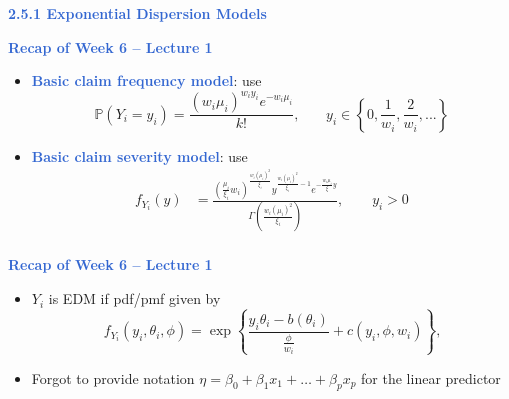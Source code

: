 \documentclass[aspectratio=169,professionalfonts,mathserif,handout]{beamer}
\newcommand{\highlight}[1]{\textcolor{Highlight}{\bf #1}}
\renewcommand{\(}{\left(}
\renewcommand{\)}{\right)}
\renewcommand{\[}{\left[}
\renewcommand{\]}{\right]}
\newcommand{\mytitle}[1]{\vspace*{-1mm}%
  \centerline{\highlight{\Large #1}}\vspace*{3mm}}
\newenvironment{slidebox}{%
  \begin{minipage}[c][7.5cm][t]{14.4cm}\raggedright}{%
  \end{minipage}}
\begin{document}
\begin{frame}\begin{slidebox}
\mytitle{2.5.1 Exponential Dispersion Models}
\end{slidebox}\end{frame}

\begin{frame}\begin{slidebox}
\mytitle{Recap of Week 6 -- Lecture 1}
\begin{itemize}
    \item \highlight{Basic claim frequency model}: use
    $$
\mathbb{P}\left(  Y_{i}=y_{i}\right)  =\frac{\left(  w_{i}\mu_{i}\right)
^{w_{i}y_{i}}e^{-w_{i}\mu_{i}}}{k!}\text{,} \qquad y_{i}\in\left\{  0,\frac{1}{w_{i}},\frac{2}{w_{i}},...\right\}  
$$
\pause
\item \highlight{Basic claim severity model}: use
\begin{align*}
f_{Y_{i}}\left(  y\right)   &  =\frac{\left(  \frac{\mu_{i}}{\xi_{i}}%
w_{i}\right)  ^{\frac{w_{i}\left(  \mu_{i}\right)  ^{2}}{\xi_{i}}}%
y^{\frac{w_{i}\left(  \mu_{i}\right)  ^{2}}{\xi_{i}}-1}e^{-\frac{w_{i}\mu_{i}%
}{\xi}y}}{\Gamma\left(  \frac{w_{i}\left(  \mu_{i}\right)  ^{2}}{\xi_{i}%
}\right)  }, \qquad y_i>0\nonumber\\
\end{align*}

\end{itemize}
\end{slidebox}\end{frame}

\begin{frame}\begin{slidebox}
\mytitle{Recap of Week 6 -- Lecture 1}
\begin{itemize}
\item $Y_i$ is EDM if pdf/pmf given by 
$$
f_{Y_{i}}\left(  y_{i},\theta_{i},\phi\right)  =\exp\left\{  \frac{y_{i}%
\theta_{i}-b\left(  \theta_{i}\right)  }{\frac{\phi}{w_{i}}}+c\left(
y_{i},\phi,w_{i}\right)  \right\}  \text{,} \label{EDM}%
$$
\pause
\item Forgot to provide notation $\eta = \beta_0 + \beta_1 x_{1}+\ldots + \beta_p x_p$ for the linear predictor
\end{itemize}
\end{slidebox}\end{frame}
\end{document}
